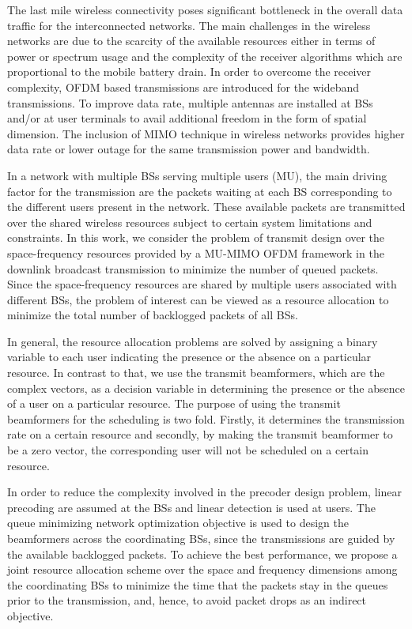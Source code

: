 
The last mile wireless connectivity poses significant bottleneck in the overall data traffic for the interconnected networks. The main challenges in the wireless networks are due to the scarcity of the available resources either in terms of power or spectrum usage and the complexity of the receiver algorithms which are proportional to the mobile battery drain. In order to overcome the receiver complexity, \ac{OFDM} based transmissions are introduced for the wideband transmissions. To improve data rate, multiple antennas are installed at \acp{BS} and/or at user terminals to avail additional freedom in the form of spatial dimension. The inclusion of \ac{MIMO} technique in wireless networks provides higher data rate or lower outage for the same transmission power and bandwidth.

In a network with multiple \acp{BS} serving multiple users (\acs{MU}), the main driving factor for the transmission are the packets waiting at each \ac{BS} corresponding to the different users present in the network. These available packets are transmitted over the shared wireless resources subject to certain system limitations and constraints. In this work, we consider the problem of transmit design over the space-frequency resources provided by a \ac{MU-MIMO} \ac{OFDM} framework in the downlink broadcast transmission to minimize the number of queued packets. Since the space-frequency resources are shared by multiple users associated with different \acp{BS}, the problem of interest can be viewed as a resource allocation to minimize the total number of backlogged packets of all \acp{BS}.

In general, the resource allocation problems are solved by assigning a binary variable to each user indicating the presence or the absence on a particular resource. In contrast to that, we use the transmit beamformers, which are the complex vectors, as a decision variable in determining the presence or the absence of a user on a particular resource. The purpose of using the transmit beamformers for the scheduling is two fold. Firstly, it determines the transmission rate on a certain resource and secondly, by making the transmit beamformer to be a zero vector, the corresponding user will not be scheduled on a certain resource.

In order to reduce the complexity involved in the precoder design problem, linear precoding are assumed at the \acp{BS} and linear detection is used at users. The queue minimizing network optimization objective is used to design the beamformers across the coordinating \acp{BS}, since the transmissions are guided by the available backlogged packets. To achieve the best performance, we propose a joint resource allocation scheme over the space and frequency dimensions among the coordinating \acp{BS} to minimize the time that the packets stay in the queues prior to the transmission, and, hence, to avoid packet drops as an indirect objective.

